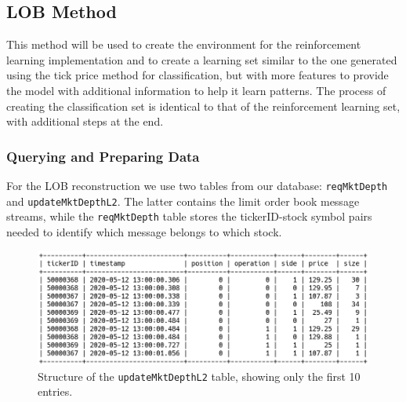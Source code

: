 \documentclass[a4paper,oneside,onecolumn,12pt]{book}
\begin{document}
	\subsection{LOB Method}
    This method will be used to create the environment for the reinforcement learning implementation and to create a learning set similar to the one generated using the tick price method for classification, but with more features to provide the model with additional information to help it learn patterns. The process of creating the classification set is identical to that of the reinforcement learning set, with additional steps at the end.
		\subsubsection{Querying and Preparing Data} 
			For the LOB reconstruction we use two tables from our database: \texttt{reqMktDepth} and \texttt{updateMktDepthL2}. The latter contains the limit order book message streams, while the \texttt{reqMktDepth} table stores the tickerID-stock symbol pairs needed to identify which message belongs to which stock.

			\begin{figure}[H]
			\begin{center}
				\includegraphics[width=\linewidth]{kep/updateMktDepthL2.png}
				\caption{Structure of the \texttt{updateMktDepthL2} table, showing only the first 10 entries.}
				\label{fig:updateMktDepthL2}
			\end{center}
			\end{figure}
\end{document}
